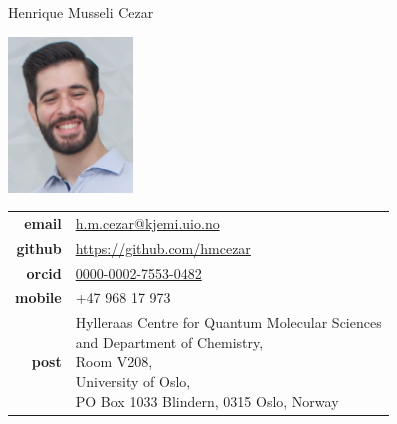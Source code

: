 \documentclass[10pt]{article}
\begin{document}
\reversemarginpar
{\selectfont \LARGE Henrique Musseli Cezar}\\[0.5cm]

\begin{minipage}[t]{2.5in}
\hspace{35pt}
\includegraphics[width=1.3in,valign=c]{images/henrique2.jpg}
\end{minipage}
\begin{minipage}[t]{3in}
\begin{tabular}{rl}
{\bf email} & \href{mailto:h.m.cezar@kjemi.uio.no}{\href{mailto:h.m.cezar@kjemi.uio.no}{h.m.cezar@kjemi.uio.no}}\\[0.05in]
{\bf github} & \href{https://github.com/hmcezar}{https://github.com/hmcezar}\\[0.05in]
{\bf orcid} & \href{https://orcid.org/0000-0002-7553-0482}{0000-0002-7553-0482}\\[0.05in]
{\bf mobile} & +47 968 17 973\\[0.05in]
{\bf post} & 
\parbox[t]{3.0in}{
  Hylleraas Centre for Quantum Molecular Sciences\\
  and Department of Chemistry, \\
  Room V208, \\
  University of Oslo, \\
  PO Box 1033 Blindern, 0315 Oslo, Norway}
\end{tabular}
\end{minipage}

\vspace{15pt} 

\noindent{}
\end{document}
